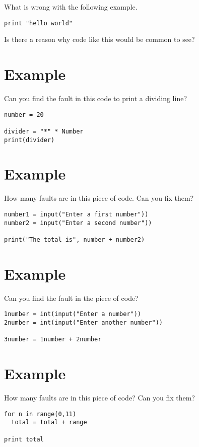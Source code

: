 \documentclass[12pt,oneside]{cttutorial}
\begin{document}
What is wrong with the following example.

\begin{lstlisting}
print "hello world"
\end{lstlisting}

Is there a reason why code like this would be common to see?

\section{Example}

Can you find the fault in this code to print a dividing line?

\begin{lstlisting}
number = 20

divider = "*" * Number
print(divider)
\end{lstlisting}



\section{Example}

How many faults are in this piece of code. Can you fix them?

\begin{lstlisting}
number1 = input("Enter a first number"))
number2 = input("Enter a second number"))

print("The total is", number + number2)
\end{lstlisting}

\section{Example}

Can you find the fault in the piece of code?

\begin{lstlisting}
1number = int(input("Enter a number"))
2number = int(input("Enter another number"))

3number = 1number + 2number
\end{lstlisting}

\section{Example}

How many faults are in this piece of code? Can you fix them?

\begin{lstlisting}
for n in range(0,11)
  total = total + range
  
print total
\end{lstlisting}
\end{document}
